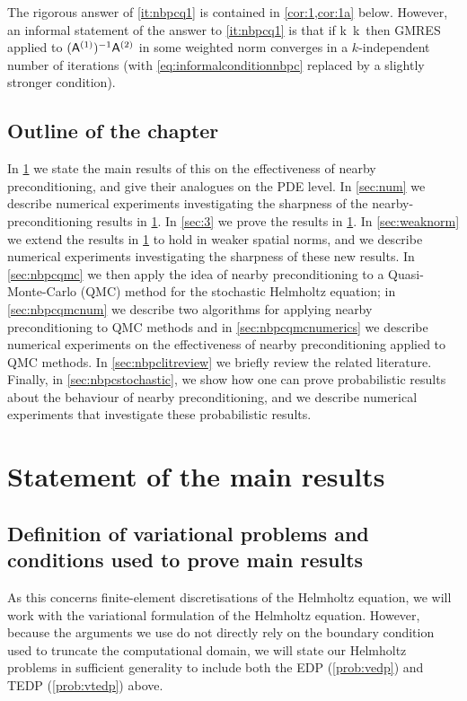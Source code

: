  The rigorous answer of \cref{it:nbpcq1} is contained in \cref{cor:1,cor:1a} below. However, an informal statement of the answer to \cref{it:nbpcq1} is that if
 \beq\label{eq:informalconditionnbpc}
k\,
\NLi{\Aso-\Ast} \quad{} \quad k\,\NLi{\nso-\nst}
\quad{}
\eeq
then GMRES applied to $(\mathsf{A}^{(1)})^{-1}\mathsf{A}^{(2)}$ in some weighted norm converges in a $k$-independent number of iterations (with \cref{eq:informalconditionnbpc} replaced by a slightly stronger condition).

 \subsection{Outline of the chapter}%
In \cref{sec:main} we state the main results of this  on the effectiveness of nearby preconditioning, and give their analogues on the PDE level. In \cref{sec:num} we describe numerical experiments investigating the sharpness of the nearby-preconditioning results in \cref{sec:main}. In \cref{sec:3} we prove the results in \cref{sec:main}. In \cref{sec:weaknorm} we extend the results in \cref{sec:main} to hold in weaker spatial norms, and we describe numerical experiments investigating the sharpness of these new results. In \cref{sec:nbpcqmc} we then apply the idea of nearby preconditioning to a Quasi-Monte-Carlo (QMC) method for the stochastic Helmholtz equation; in \cref{sec:nbpcqmcnum} we describe two algorithms for applying nearby preconditioning to QMC methods and in \cref{sec:nbpcqmcnumerics} we describe numerical experiments on the effectiveness of nearby preconditioning applied to QMC methods. In \cref{sec:nbpclitreview} we briefly review the related literature. Finally, in \cref{sec:nbpcstochastic}, we show how one can prove probabilistic results about the behaviour of nearby preconditioning, and we describe numerical experiments that investigate these probabilistic results.

\section{Statement of the main results}\label{sec:main}

\subsection{Definition of variational problems and conditions used to prove main results}\label{sec:vpGm}
As this  concerns finite-element discretisations of the Helmholtz equation, we will work with the variational formulation of the Helmholtz equation. However, because the arguments we use do not directly rely on the boundary condition used to truncate the computational domain, we will state our Helmholtz problems in sufficient generality to include both the EDP (\cref{prob:vedp}) and TEDP (\cref{prob:vtedp}) above.

